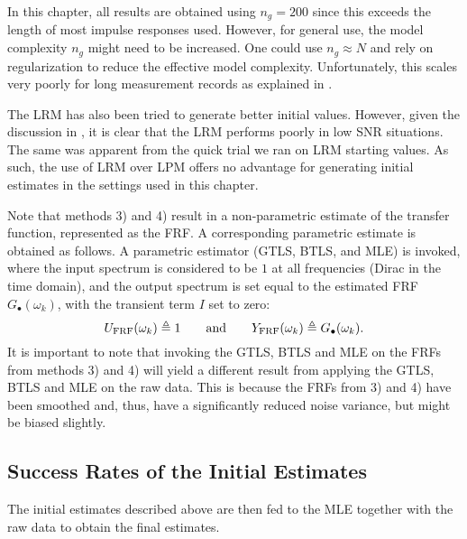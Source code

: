 \begin{remark} \label{rem:initvals:orders:RFIR}
In this chapter, all results are obtained using $n_g=200$ since this exceeds the length of most impulse responses used.
However, for general use, the model complexity $n_g$ might need to be increased.
One could use $n_g \approx N$ and rely on regularization to reduce the effective model complexity.
Unfortunately, this scales very poorly for long measurement records as explained in .
\end{remark}

\begin{remark}
The \gls{LRM} has also been tried to generate better initial values.
However, given the discussion in , it is clear that the \gls{LRM} performs poorly in low \gls{SNR} situations.
The same was apparent from the quick trial we ran on \gls{LRM} starting values.
As such, the use of \gls{LRM} over \gls{LPM} offers no advantage for generating initial estimates in the settings used in this chapter.
\end{remark}


\begin{remark}
Note that methods 3) and 4) result in a non-parametric estimate of the transfer function, represented as the \gls{FRF}. 
A corresponding parametric estimate is obtained as follows. 
A parametric estimator (\gls{GTLS}, \gls{BTLS}, and \gls{MLE}) is invoked, where the input spectrum is considered to be $1$ at all frequencies (Dirac in the time domain), and the output spectrum is set equal to the estimated \gls{FRF} $G_{\bullet}(\omega_k)$, with the transient term $I$ set to zero:
\begin{equation}
  U_{\mathrm{FRF}}(\omega_k) \triangleq 1 
  \qquad \text{and} \qquad
  Y_{\mathrm{FRF}}(\omega_k)  \triangleq G_{\bullet}(\omega_k)
  \text{.}
\end{equation}
It is important to note that invoking the \gls{GTLS}, \gls{BTLS} and \gls{MLE} on the \glspl{FRF} from methods 3) and 4) will yield a different result from applying the \gls{GTLS}, \gls{BTLS} and \gls{MLE} on the raw data. 
This is because the \glspl{FRF} from 3) and 4) have been smoothed and, thus, have a significantly reduced noise variance, but might be biased slightly.
\end{remark}

\subsection{Success Rates of the Initial Estimates}
The initial estimates described above are then fed to the \gls{MLE} together with the raw data to obtain the final estimates.

